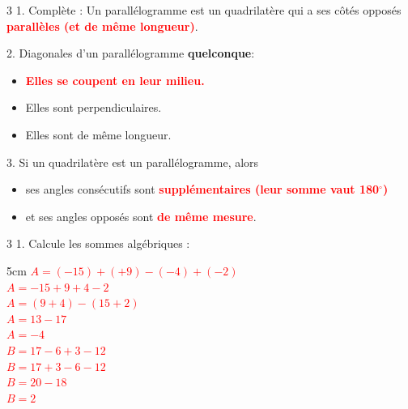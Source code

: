 \documentclass[a4paper]{book}
\begin{document}
{    \newpage

    \setcounter{exo}{0}

    \begin{exerciceNote}{3}
        1. Complète : Un parallélogramme est un quadrilatère qui a ses côtés opposés \textcolor{red}{\textbf{parallèles (et de même longueur)}}.\vspace{0.5cm}
        
        2. Diagonales d'un parallélogramme \textbf{quelconque}:
        \begin{itemize}[label=$\square$]
            \item[\textcolor{red}{\rlap{$\blacksquare$}$\square$}] \textcolor{red}{\textbf{Elles se coupent en leur milieu.}}
            \item Elles sont perpendiculaires.
            \item Elles sont de même longueur.
        \end{itemize}\vspace{0.5cm}
        
        3. Si un quadrilatère est un parallélogramme, alors 
        \medskip
        \begin{itemize}
            \item ses angles consécutifs sont \textcolor{red}{\textbf{supplémentaires (leur somme vaut 180$^\circ$)}} \medskip
            \item et ses angles opposés sont \textcolor{red}{\textbf{de même mesure}}.
        \end{itemize} 
    \end{exerciceNote}
    
    \begin{exerciceNote}{3}
        1. Calcule les sommes algébriques :
        \begin{ZoneReponse}{5cm}
            \textcolor{red}{
            $A = (-15) + (+9) - (-4) + (-2)$\\
            $A = -15 + 9 + 4 - 2$\\
            $A = (9 + 4) - (15 + 2)$\\
            $A = 13 - 17$\\
            $A = -4$
            }
            \vspace{0.3cm}\\
            \textcolor{red}{
            $B = 17 - 6 + 3 - 12$\\
            $B = 17 + 3 - 6 - 12$\\
            $B = 20 - 18$\\
            $B = 2$
            }
        \end{ZoneReponse}
        

\end{exerciceNote}}
\end{document}
